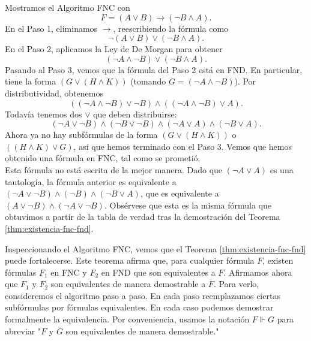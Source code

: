 \documentclass[12pt,a4paper]{book}
\newcommand{\comillas}[1]{"#1"}
\begin{document}
    \begin{ejemplo}\label{ej:algoritmo-fnc}
        Mostramos el Algoritmo FNC con
        \begin{equation*}
            F=(A\vee B)\rightarrow(\neg B\wedge A).
        \end{equation*}
        En el Paso 1, eliminamos $\rightarrow$, reescribiendo la fórmula como
        \begin{equation*}
            \neg(A\vee B)\vee(\neg B\wedge A).
        \end{equation*}
        En el Paso 2, aplicamos la Ley de De Morgan para obtener
        \begin{equation*}
            (\neg A\wedge\neg B)\vee(\neg B\wedge A).
        \end{equation*}
        Pasando al Paso 3, vemos que la fórmula del Paso 2 está en FND. En particular, tiene la forma $(G\vee(H\wedge K))$
        (tomando $G=(\neg A\wedge\neg B)$). Por distributividad, obtenemos
        \begin{equation*}
            ((\neg A\wedge\neg B)\vee\neg B)\wedge((\neg A\wedge\neg B)\vee A).
        \end{equation*}
        Todavía tenemos dos $\vee$ que deben distribuirse:
        \begin{equation*}
            (\neg A\vee\neg B)\wedge(\neg B\vee\neg B)\wedge(\neg A\vee A)\wedge(\neg B\vee A).
        \end{equation*}
        Ahora ya no hay subfórmulas de la forma $(G\vee(H\wedge K))$ o $((H\wedge K)\vee G)$, así que hemos terminado con el
        Paso 3. Vemos que hemos obtenido una fórmula en FNC, tal como se prometió.\\
        Esta fórmula no está escrita de la mejor manera. Dado que $(\neg A\vee A)$ es una tautología, la fórmula anterior es
        equivalente a $(\neg A\vee\neg B)\wedge(\neg B)\wedge(\neg B\vee A)$, que es equivalente a
        $(A\vee\neg B)\wedge(\neg A\vee\neg B)$. Obsérvese que esta es la misma fórmula que obtuvimos a partir de la tabla de
        verdad tras la demostración del Teorema \ref{thm:existencia-fnc-fnd}.
    \end{ejemplo}

    Inspeccionando el Algoritmo FNC, vemos que el Teorema \ref{thm:existencia-fnc-fnd} puede fortalecerse. Este teorema
    afirma que, para cualquier fórmula $F$, existen fórmulas $F_{1}$ en FNC y $F_{2}$ en FND que son equivalentes a $F$.
    Afirmamos ahora que $F_{1}$ y $F_{2}$ son equivalentes de manera demostrable a $F$. Para verlo, consideremos el algoritmo
    paso a paso. En cada paso reemplazamos ciertas subfórmulas por fórmulas equivalentes. En cada caso podemos demostrar
    formalmente la equivalencia. Por conveniencia, usamos la notación $F\Vdash G$ para abreviar \comillas{$F$ y $G$
    son equivalentes de manera demostrable.}
\end{document}
